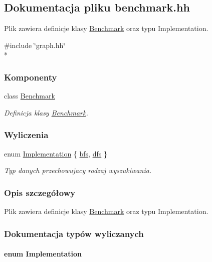 \hypertarget{benchmark_8hh}{\subsection{Dokumentacja pliku benchmark.\-hh}
\label{benchmark_8hh}
}


Plik zawiera definicje klasy \hyperlink{class_benchmark}{Benchmark} oraz typu Implementation.  


{\ttfamily \#include \char`\"{}graph.\-hh\char`\"{}}\\*
\subsubsection*{Komponenty}
\begin{DoxyCompactItemize}
\item 
class \hyperlink{class_benchmark}{Benchmark}
\begin{DoxyCompactList}\small\item\em Definicja klasy \hyperlink{class_benchmark}{Benchmark}. \end{DoxyCompactList}\end{DoxyCompactItemize}
\subsubsection*{Wyliczenia}
\begin{DoxyCompactItemize}
\item 
enum \hyperlink{benchmark_8hh_a9107acb389f0886054bea6298a73e191}{Implementation} \{ \hyperlink{benchmark_8hh_a9107acb389f0886054bea6298a73e191a959b45298972c58c8cea0f81e9d04495}{bfs}, 
\hyperlink{benchmark_8hh_a9107acb389f0886054bea6298a73e191a1a01e4a8f21847034cc98ab41323694d}{dfs}
 \}
\begin{DoxyCompactList}\small\item\em Typ danych przechowujacy rodzaj wyszukiwania. \end{DoxyCompactList}\end{DoxyCompactItemize}


\subsubsection{Opis szczegółowy}
Plik zawiera definicje klasy \hyperlink{class_benchmark}{Benchmark} oraz typu Implementation. 

\subsubsection{Dokumentacja typów wyliczanych}
\hypertarget{benchmark_8hh_a9107acb389f0886054bea6298a73e191}{
\paragraph[{Implementation}]{\setlength{\rightskip}{0pt plus 5cm}enum {\bf Implementation}}}\label{benchmark_8hh_a9107acb389f0886054bea6298a73e191}


